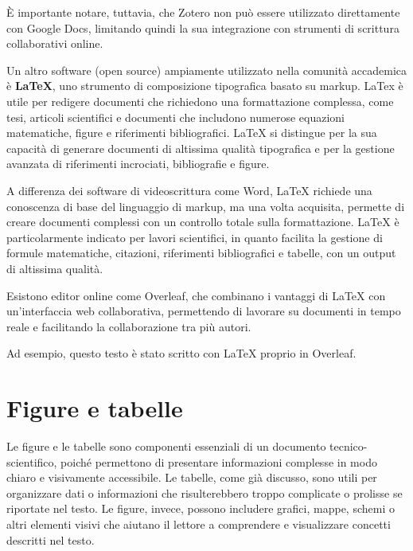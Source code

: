 \documentclass[9pt,a4paper,twoside]{rho-class/rho}
\begin{document}
È importante notare, tuttavia, che Zotero non può essere utilizzato direttamente con Google Docs, limitando quindi la sua integrazione con strumenti di scrittura collaborativi online.

Un altro software (open source) ampiamente utilizzato nella comunità accademica è \textbf{LaTeX}, uno strumento di composizione tipografica basato su markup. LaTex è utile per redigere documenti che richiedono una formattazione complessa, come tesi, articoli scientifici e documenti che includono numerose equazioni matematiche, figure e riferimenti bibliografici. LaTeX si distingue per la sua capacità di generare documenti di altissima qualità tipografica e per la gestione avanzata di riferimenti incrociati, bibliografie e figure.

A differenza dei software di videoscrittura come Word, LaTeX richiede una conoscenza di base del linguaggio di markup, ma una volta acquisita, permette di creare documenti complessi con un controllo totale sulla formattazione. LaTeX è particolarmente indicato per lavori scientifici, in quanto facilita la gestione di formule matematiche, citazioni, riferimenti bibliografici e tabelle, con un output di altissima qualità.

Esistono editor online come Overleaf, che combinano i vantaggi di LaTeX con un’interfaccia web collaborativa, permettendo di lavorare su documenti in tempo reale e facilitando la collaborazione tra più autori. 

Ad esempio, questo testo è stato scritto con LaTeX proprio in Overleaf.

\section{Figure e tabelle}
Le figure e le tabelle sono componenti essenziali di un documento tecnico-scientifico, poiché permettono di presentare informazioni complesse in modo chiaro e visivamente accessibile. Le tabelle, come già discusso, sono utili per organizzare dati o informazioni che risulterebbero troppo complicate o prolisse se riportate nel testo. Le figure, invece, possono includere grafici, mappe, schemi o altri elementi visivi che aiutano il lettore a comprendere e visualizzare concetti descritti nel testo.
\end{document}
